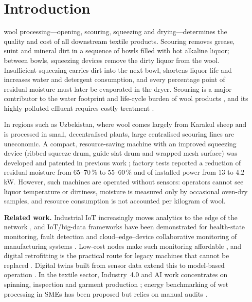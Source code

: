 \documentclass[journal]{IEEEtran}
\begin{document}
\section{Introduction}
 wool processing---opening, scouring, squeezing and drying---determines the quality and cost of
all downstream textile products. Scouring removes grease, suint and mineral dirt in a sequence of bowls filled with hot
alkaline liquor; between bowls, squeezing devices remove the dirty liquor from the wool. Insufficient squeezing carries
dirt into the next bowl, shortens liquor life and increases water and detergent consumption, and every percentage point
of residual moisture must later be evaporated in the dryer. Scouring is a major contributor to the water footprint and
life-cycle burden of wool products \cite{li2022water,bianco2023life}, and its highly polluted effluent requires costly
treatment \cite{shi2023inorganic,sinisaari2025performance}.

In regions such as Uzbekistan, where wool comes largely from Karakul sheep and is processed in small, decentralised
plants, large centralised scouring lines are uneconomic. A compact, resource-saving machine with an improved squeezing
device (ribbed squeeze drum, guide slat drum and wrapped mesh surface) was developed and patented in previous work
\cite{tuguzbayeva2024,patent02351}; factory tests reported a reduction of residual moisture from 65--70\,\% to
55--60\,\% and of installed power from 13 to 4.2\,kW. However, such machines are operated without sensors: operators
cannot see liquor temperature or dirtiness, moisture is measured only by occasional oven-dry samples, and resource
consumption is not accounted per kilogram of wool.

\textbf{Related work.} Industrial IoT increasingly moves analytics to the edge of the network
\cite{qiu2020edge,deng2020edge}, and IoT/big-data frameworks have been demonstrated for health-state monitoring,
fault detection and cloud--edge--device collaborative monitoring of manufacturing systems
\cite{yu2022integrated,yu2023edge,zhang2026trinity}. Low-cost nodes make such monitoring affordable
\cite{gonzalez2022hypnos,kalamaras2025low}, and digital retrofitting is the practical route for legacy machines that
cannot be replaced \cite{alqoud2022industry}. Digital twins built from sensor data extend this to model-based
operation \cite{leng2021digital,friederich2022framework,perno2022implementation}. In the textile sector, Industry~4.0
and AI work concentrates on spinning, inspection and garment production
\cite{han2024prediction,xu2025zero,safavi2025clothing,ingle2025review}; energy benchmarking of wet processing in SMEs
has been proposed but relies on manual audits \cite{kasturi2022methodological}.
\end{document}
